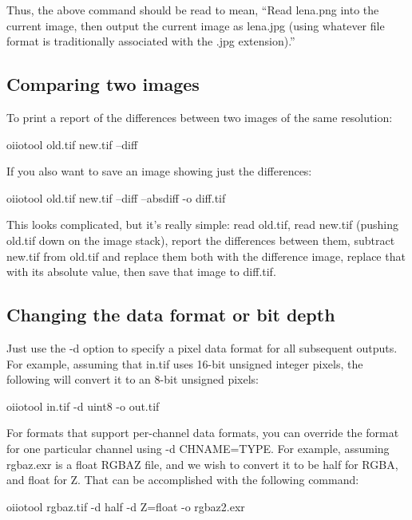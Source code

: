 Thus, the above command should be read to mean, ``Read {\cf lena.png}
into the current image, then output the current image as {\cf lena.jpg}
(using whatever file format is traditionally associated with the {\cf
  .jpg} extension).''


\subsection*{Comparing two images}

To print a report of the differences between two images of the same
resolution:

\begin{code}
    oiiotool old.tif new.tif --diff
\end{code}

\noindent If you also want to save an image showing just the differences:

\begin{code}
    oiiotool old.tif new.tif --diff --absdiff -o diff.tif
\end{code}

This looks complicated, but it's really simple: read {\cf old.tif},
read {\cf new.tif} (pushing {\cf old.tif} down on the image stack),
report the differences between them, subtract {\cf new.tif} from 
{\cf old.tif} and replace them both with the difference image,
replace that with its absolute value, then save that image to 
{\cf diff.tif}.


\subsection*{Changing the data format or bit depth}

Just use the {\cf -d} option to specify a pixel data format for all
subsequent outputs.  For example, assuming that {\cf in.tif} uses 16-bit
unsigned integer pixels, the following will convert it to an 8-bit
unsigned pixels:

\begin{code}
    oiiotool in.tif -d uint8 -o out.tif
\end{code}

For formats that support per-channel data formats, you can override
the format for one particular channel using {\cf -d CHNAME=TYPE}.
For example, assuming {\cf rgbaz.exr} is a {\cf float} RGBAZ file,
and we wish to convert it to be {\cf half} for RGBA, and {\cf float}
for Z.  That can be accomplished with the following command:

\begin{code}
    oiiotool rgbaz.tif -d half -d Z=float -o rgbaz2.exr
\end{code}


